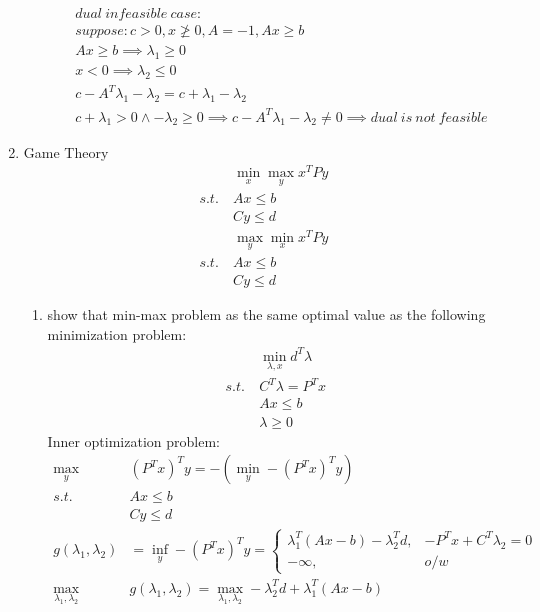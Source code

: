 \documentclass[12pt,letter]{article}
\begin{document}
\begin{enumerate}
\begin{itemize}
\begin{align*}
      \\
      &dual\ infeasible\ case:\\
      &suppose: c > 0, x \not\geq 0, A=-1, Ax \geq b\\
      &Ax \geq b \implies \lambda_1 \geq 0\\
      &x < 0 \implies \lambda_2 \leq 0\\
      &c-A^T\lambda_1-\lambda_2 = c+\lambda_1 - \lambda_2\\
      &c+\lambda_1>0 \wedge -\lambda_2 \geq 0 \implies c-A^T\lambda_1-\lambda_2 \not=0 \implies dual\ is\ not\ feasible
    \end{align*}
  \end{itemize}
\item Game Theory
  \begin{align*}
    &\min_x \max_y x^TPy\\
    s.t.\ &Ax \leq b\\
    &Cy \leq d
  \end{align*}
  \begin{align*}
      &\max_y \min_x x^TPy\\
      s.t.\ &Ax \leq b\\
      &Cy \leq d
    \end{align*}
  \begin{enumerate}
  \item show that min-max problem as the same optimal value as the following minimization problem:
    \begin{align*}
      &\min_{\lambda,x} d^T \lambda\\
      s.t.\ & C^T \lambda = P^Tx\\
      &Ax \leq b\\
      &\lambda \geq 0
    \end{align*}
    Inner optimization problem:
    \begin{align*}
      \max_y & (P^Tx)^T y = -(\min_y -(P^Tx)^T y)\\
      s.t.\ &Ax \leq b\\
             &Cy \leq d\\
      g(\lambda_1,\lambda_2) & = \inf_y -(P^Tx)^T y =
                           \begin{cases}
                             \lambda_1^T(Ax-b)-\lambda_2^Td, & -P^Tx+C^T\lambda_2 = 0\\
                             -\infty, & o/w
                           \end{cases}\\
      \max_{\lambda_1,\lambda_2}\ & g(\lambda_1,\lambda_2) = \max_{\lambda_1,\lambda_2} -\lambda_2^Td + \lambda_1^T(Ax-b)\\

\end{align*}
\end{enumerate}
\end{enumerate}
\end{document}
